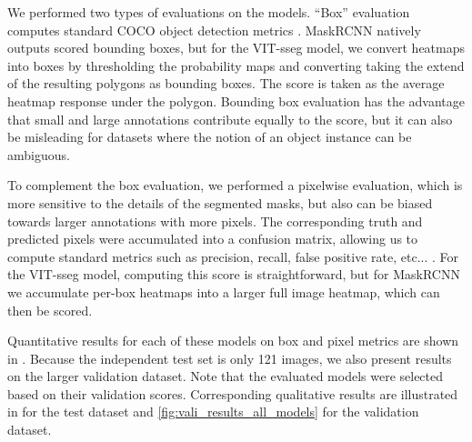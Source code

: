 \documentclass{article}
\begin{document}

We performed two types of evaluations on the models.
``Box'' evaluation computes standard COCO object detection metrics \cite{lin_microsoft_2014}.
MaskRCNN natively outputs scored bounding boxes, but for the VIT-sseg model, we convert heatmaps into boxes
  by thresholding the probability maps and converting taking the extend of the resulting polygons as bounding
  boxes.
The score is taken as the average heatmap response under the polygon.
Bounding box evaluation has the advantage that small and large annotations contribute equally to the score,
  but it can also be misleading for datasets where the notion of an object instance can be ambiguous.

To complement the box evaluation, we performed a pixelwise evaluation, which is more sensitive to the
  details of the segmented masks, but also can be biased towards larger annotations with more pixels.
The corresponding truth and predicted pixels were accumulated into a confusion matrix, allowing us to
  compute standard metrics such as precision, recall, false positive rate, etc... \cite{powers_evaluation_2011}.
For the VIT-sseg model, computing this score is straightforward, but for MaskRCNN we accumulate per-box
  heatmaps into a larger full image heatmap, which can then be scored.

Quantitative results for each of these models on box and pixel metrics are shown in
  .
Because the independent test set is only 121 images, we also present results on the larger validation
  dataset.
Note that the evaluated models were selected based on their validation scores.
Corresponding qualitative results are illustrated in  for the test dataset
  and \cref{fig:vali_results_all_models} for the validation dataset.
\end{document}
